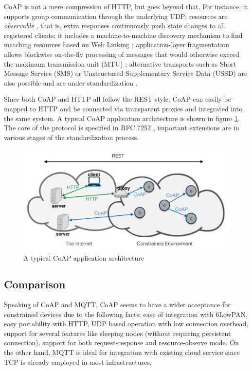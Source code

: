 CoAP is not a mere compression of HTTP, but goes beyond that. For instance, it supports group communication through the underlying UDP; resources are \textit{observable} \cite{coap_observe}, that is, extra responses continuously push state changes to all registered clients; it includes a machine-to-machine discovery mechanism to find matching resources based on Web Linking \cite{core}; application-layer fragmentation allows blockwise on-the-fly processing of messages that would otherwise exceed the maximum transmission unit (MTU) \cite{blockwise}; alternative transports such as Short Message Service (SMS) or Unstructured Supplementary Service Data (USSD) are also possible and are under standardization \cite{coap_alter_trans}.

Since both CoAP and HTTP all follow the REST style, CoAP can easily be mapped to HTTP and be connected via transparent proxies and integrated into the same system. A typical CoAP application architecture is shown in figure \ref{fig:coap_app_architecture}. The core of the protocol is specified in RFC 7252 \cite{coap_protocol}, important extensions are in various stages of the standardization process. 

\begin{figure}[!htbp]
\centering
\includegraphics[scale = 0.55]{coap_app_architecture.png}
\caption{A typical CoAP application architecture}
\label{fig:coap_app_architecture}
\end{figure}

\subsection{Comparison}

Speaking of CoAP and MQTT, CoAP seems to have a wider acceptance for constrained devices due to the following facts: ease of integration with 6LowPAN, easy portability with HTTP, UDP based operation with low connection overhead, support for several features like sleeping nodes \cite{coap_protocol}(without requiring persistent connection), support for both request-response and resource-observe mode. On the other hand, MQTT is ideal for integration with existing cloud service since TCP is already employed in most infrastructures. 

